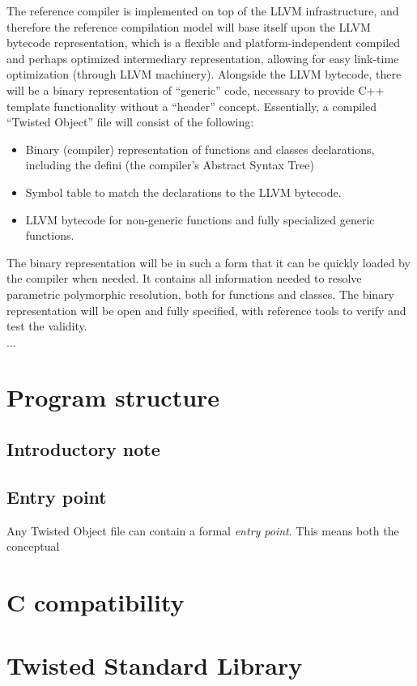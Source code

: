 \documentclass[a4paper,11pt]{article}
\begin{document}
The reference compiler is implemented on top of the LLVM infrastructure, and therefore the reference compilation model will base itself upon the LLVM bytecode representation, which is a flexible and platform-independent compiled and perhaps optimized intermediary representation, allowing for easy link-time optimization (through LLVM machinery).
Alongside the LLVM bytecode, there will be a binary representation of “generic” code, necessary to provide C++ template functionality without a “header” concept.
Essentially, a compiled “Twisted Object” file will consist of the following:
\begin{itemize}
  \item Binary (compiler) representation of functions and classes declarations, including the defini (the compiler’s Abstract Syntax Tree)
  \item Symbol table to match the declarations to the LLVM bytecode.
  \item LLVM bytecode for non-generic functions and fully specialized generic functions.
\end{itemize}
The binary representation will be in such a form that it can be quickly loaded by the compiler when needed.
It contains all information needed to resolve parametric polymorphic resolution, both for functions and classes.
The binary representation will be open and fully specified, with reference tools to verify and test the validity.
\\ ...

\section{Program structure}
  \subsection{Introductory note}


  \subsection{Entry point}

Any Twisted Object file can contain a formal \emph{entry point}.
This means both the conceptual 

\section{C compatibility} \label{sec:c_compatibility}

\section{Twisted Standard Library}
\end{document}
